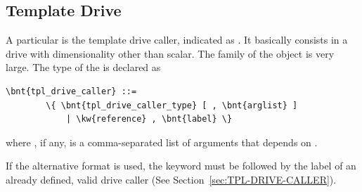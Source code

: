 \subsection{Template Drive}\label{sec:TplDriveCaller}
A particular  is the template drive caller,
indicated as .
It basically consists in a drive with dimensionality other than scalar.
The family of the  object is very large.
The type of the  is declared as
\begin{Verbatim}[commandchars=\\\{\}]
    \bnt{tpl_drive_caller} ::=
        \{ \bnt{tpl_drive_caller_type} [ , \bnt{arglist} ]
            | \kw{reference} , \bnt{label} \}
\end{Verbatim}    
where , if any, is a comma-separated list of arguments
that depends on .

If the alternative format is used, the keyword  
must be followed by the label of an already defined, valid drive caller
(See Section~\ref{sec:TPL-DRIVE-CALLER}).

